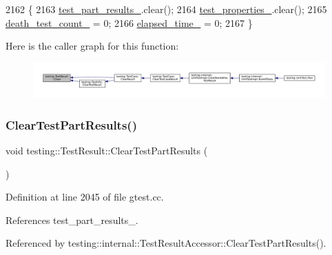 \begin{DoxyCode}
2162                        \{
2163   \hyperlink{classtesting_1_1TestResult_af17c00fae1435d344b318eb6bbb56cff}{test\_part\_results\_}.clear();
2164   \hyperlink{classtesting_1_1TestResult_a29cde491988faff4ef2d9f9b6c13d9fa}{test\_properties\_}.clear();
2165   \hyperlink{classtesting_1_1TestResult_a3810b34e68f5dca9ad1237a5bde7fa21}{death\_test\_count\_} = 0;
2166   \hyperlink{classtesting_1_1TestResult_a739a8ca54db4be004ba748b11e82b056}{elapsed\_time\_} = 0;
2167 \}
\end{DoxyCode}
Here is the caller graph for this function\+:
\nopagebreak
\begin{figure}[H]
\begin{center}
\leavevmode
\includegraphics[width=350pt]{classtesting_1_1TestResult_a5371bc2e69435b4cb1fdad9ca81759a6_icgraph}
\end{center}
\end{figure}
\mbox{\label{classtesting_1_1TestResult_aa11ed718e0a76a39e6380e5ddce7cae2}} 
\subsubsection{\texorpdfstring{Clear\+Test\+Part\+Results()}{ClearTestPartResults()}}
{\footnotesize\ttfamily void testing\+::\+Test\+Result\+::\+Clear\+Test\+Part\+Results (\begin{DoxyParamCaption}{ }\end{DoxyParamCaption})\hspace{0.3cm}{\ttfamily [private]}}



Definition at line 2045 of file gtest.\+cc.



References test\+\_\+part\+\_\+results\+\_\+.



Referenced by testing\+::internal\+::\+Test\+Result\+Accessor\+::\+Clear\+Test\+Part\+Results().


